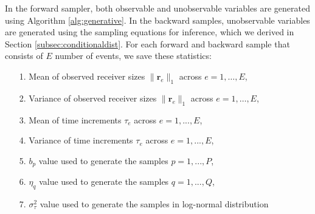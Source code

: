 \documentclass[ba]{imsart}
\numberwithin{equation}{section}
\theoremstyle{plain}
\begin{document}
	In the forward sampler, both observable and unobservable variables are generated using Algorithm \ref{alg:generative}. In the backward samples, unobservable variables are generated using the sampling equations for inference, which we derived in Section \ref{subsec:conditionaldist}. For each forward and backward sample that consists of $E$ number of events, we save these statistics:\\
	\begin{itemize}
		\item[1.] Mean of observed receiver sizes $ \lVert \boldsymbol{r}_{e} \rVert_1 $ across $e=1,\ldots,E$,
		\item[2.] Variance of observed receiver sizes $ \lVert \boldsymbol{r}_{e} \rVert_1 $ across $e=1,\ldots,E$,
		\item[3.] Mean of time increments $\tau_e$ across $e=1,...,E$,
		\item[4.] Variance of time increments $\tau_e$ across $e=1,...,E$,
		\item[5.] $b_p$ value used to generate the samples $p = 1,...,P$,
		\item[6.] $\eta_q$ value used to generate the samples $q = 1,...,Q$,
		\item[7.] $\sigma^2_\tau$ value used to generate the samples in log-normal distribution
	\end{itemize}
\end{document}
